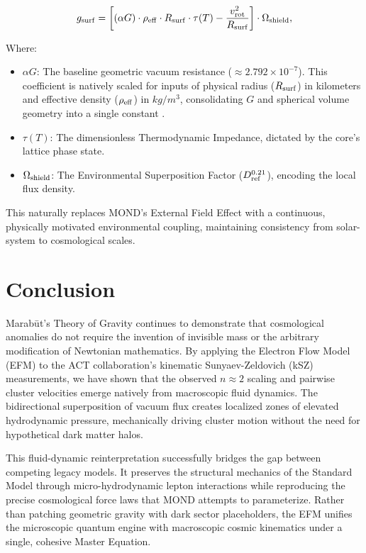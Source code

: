 \documentclass[11pt, a4paper]{article}
\begin{document}
\begin{equation}
  g_{\rm surf} = \left[ (\alpha G) \cdot \rho_{\rm eff} \cdot R_{\rm surf} \cdot \tau(T) - \frac{v_{\rm rot}^2}{R_{\rm surf}} \right] \cdot \Omega_{\rm shield},
\end{equation}

Where:
\begin{itemize}
  \item \textbf{$\alpha G$}: The baseline geometric vacuum resistance ($\approx 2.792 \times 10^{-7}$). This coefficient is natively scaled for inputs of physical radius ($R_{\rm surf}$) in kilometers and effective density ($\rho_{\rm eff}$) in $kg/m^3$, consolidating $G$ and spherical volume geometry into a single constant \cite{marabut2026m1}.
  \item \textbf{$\tau(T)$}: The dimensionless Thermodynamic Impedance, dictated by the core's lattice phase state.
  \item \textbf{$\Omega_{\rm shield}$}: The Environmental Superposition Factor ($D_{\rm ref}^{0.21}$), encoding the local flux density.
\end{itemize}

This naturally replaces MOND's External Field Effect with a continuous, physically motivated environmental coupling, maintaining consistency from solar-system to cosmological scales.

\section{Conclusion}
Marab\={u}t's Theory of Gravity continues to demonstrate that cosmological anomalies do not require the invention of invisible mass or the arbitrary modification of Newtonian mathematics. By applying the Electron Flow Model (EFM) to the ACT collaboration's kinematic Sunyaev-Zeldovich (kSZ) measurements, we have shown that the observed $n \approx 2$ scaling and pairwise cluster velocities emerge natively from macroscopic fluid dynamics. The bidirectional superposition of vacuum flux creates localized zones of elevated hydrodynamic pressure, mechanically driving cluster motion without the need for hypothetical dark matter halos.

This fluid-dynamic reinterpretation successfully bridges the gap between competing legacy models. It preserves the structural mechanics of the Standard Model through micro-hydrodynamic lepton interactions while reproducing the precise cosmological force laws that MOND attempts to parameterize. Rather than patching geometric gravity with dark sector placeholders, the EFM unifies the microscopic quantum engine with macroscopic cosmic kinematics under a single, cohesive Master Equation.
\end{document}
